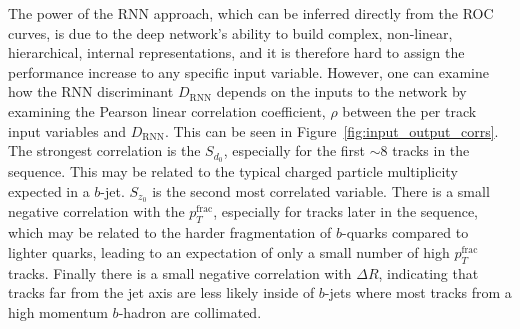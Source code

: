 

The power of the RNN approach, which can be inferred directly from the ROC curves, is due to the deep network’s ability to build complex, non-linear, hierarchical, internal representations, and it is therefore hard to assign the performance increase to any specific input variable.
However, one can examine how the RNN discriminant $D_{\mathrm{RNN}}$ depends on the inputs to the network by examining the Pearson linear correlation coefficient, $\rho$ between the per track input variables and $D_{\mathrm{RNN}}$.  This can be seen in Figure~\ref{fig:input_output_corrs}.  The strongest correlation is the $S_{d_0}$, especially for the first  $\sim8$ tracks in the sequence.  This may be related to the typical charged particle multiplicity expected in a $b$-jet. $S_{z_0}$ is the second most correlated variable. There is a small negative correlation with the $p_T^{\textrm{frac}}$, especially for tracks later in the sequence, which may be related to the harder fragmentation of $b$-quarks compared to lighter quarks, leading to an expectation of only a small number of high $p_T^{\textrm{frac}}$ tracks. Finally there is a small negative correlation with $\Delta R$, indicating that tracks far from the jet axis are less likely inside of $b$-jets where most tracks from a high momentum $b$-hadron are collimated.

